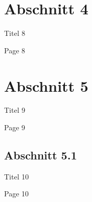 \documentclass[xcolor={dvipsnames}]{beamer}
\begin{document}
\section{Abschnitt 4}
\begin{frame}{\centerline{Titel 8}}
Page 8
\end{frame}
\section{Abschnitt 5}
\begin{frame}{\centerline{Titel 9}}
Page 9
\end{frame}
\subsection{Abschnitt 5.1}
\begin{frame}{\centerline{Titel 10}}
Page 10
\end{frame}
\end{document}
